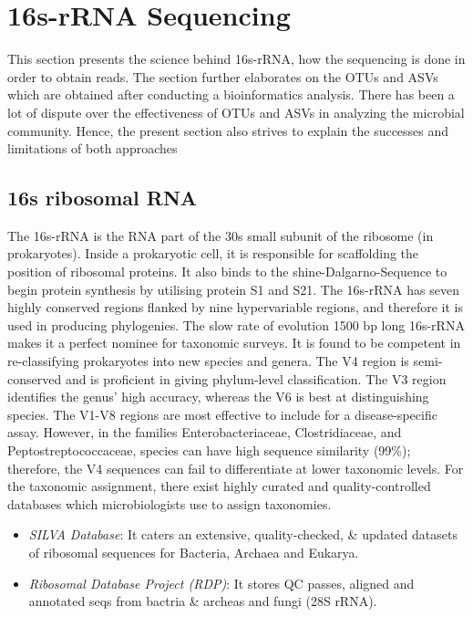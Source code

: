 \chapter{16s-rRNA Sequencing}
 \setcounter{page}{9}

This section presents the science behind 16s-rRNA, how the sequencing is done in order to obtain reads. The section further elaborates on the OTUs and ASVs which are obtained after conducting a bioinformatics analysis. There has been a lot of dispute over the effectiveness of OTUs and ASVs in analyzing the microbial community. Hence, the present section also strives to explain the successes and limitations of both approaches

\section{16s ribosomal RNA}
The 16s-rRNA is the RNA part of the 30s small subunit of the ribosome (in prokaryotes).  Inside a prokaryotic cell, it is responsible for scaffolding the position of ribosomal proteins. It also binds to the shine-Dalgarno-Sequence to begin protein synthesis by utilising protein S1 and S21. The 16s-rRNA has seven highly conserved regions flanked by nine hypervariable regions, and therefore it is used in producing phylogenies. The slow rate of evolution 1500 bp long 16s-rRNA makes it a perfect nominee for taxonomic surveys. It is found to be competent in re-classifying prokaryotes into new species and genera. The V4 region is semi-conserved and is proficient in giving phylum-level classification. The V3 region identifies the genus' high accuracy, whereas the V6 is best at distinguishing species. The V1-V8 regions are most effective to include for a disease-specific assay. However, in the families Enterobacteriaceae, Clostridiaceae, and Peptostreptococcaceae, species can have high sequence similarity (99\%); therefore, the V4 sequences can fail to differentiate at lower taxonomic levels. For the taxonomic assignment, there exist highly curated and quality-controlled databases which microbiologists use to assign taxonomies.

\begin{itemize}
  \item \textit{SILVA Database}: It caters an extensive, quality-checked, \& updated datasets of ribosomal sequences for Bacteria, Archaea and Eukarya.
  \item \textit{Ribosomal Database Project (RDP)}: It stores QC passes, aligned and annotated seqs from bactria \& archeas and fungi (28S rRNA).
\end{itemize}

